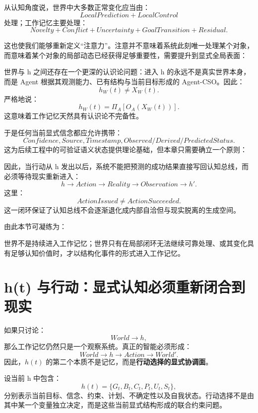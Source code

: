 从认知角度说，世界中大多数正常变化应当由：
\[
LocalPrediction
+
LocalControl
\]
处理；工作记忆主要处理：
\[
Novelty
+
Conflict
+
Uncertainty
+
GoalTransition
+
Residual.
\]

这也使我们能够重新定义“注意力”。注意并不意味着系统此刻唯一处理某个对象，而意味着某个对象的局部动态已经获得足够重要性，需要提升到显式全局表面：
\begin{statementbox}
\centering
{}
\end{statementbox}

世界与 h 之间还存在一个更深的认识论问题：进入 h 的永远不是真实世界本身，而是 Agent 根据其观测能力、已有结构与当前目标形成的 Agent-CSO。因此：
\[
h_W(t)
\neq
X_W(t).
\]
严格地说：
\[
h_W(t)
=
\Pi_A
\left[
O_A(X_W(t))
\right].
\]
这意味着工作记忆天然具有认识论不完备性。

于是任何当前显式信念都应允许携带：
\[
Confidence,
Source,
Timestamp,
Observed/Derived/PredictedStatus.
\]
这为后续工程中的可验证语义状态提供理论基础，但本章只需要确立一个原则：
\begin{statementbox}
\centering
{}
\end{statementbox}

因此，当行动从 h 发出以后，系统不能把预测的成功结果直接写回认知总线，而必须等待现实重新进入：
\[
h
\rightarrow
Action
\rightarrow
Reality
\rightarrow
Observation
\rightarrow
h'.
\]
这里：
\[
ActionIssued
\neq
ActionSucceeded.
\]
这一闭环保证了认知总线不会逐渐退化成内部自洽但与现实脱离的生成空间。

由此本节可凝练为：
\begin{statementbox}
世界不是持续进入工作记忆；世界只有在局部闭环无法继续可靠处理、或其变化具有足够认知价值时，才以结构化事件的形式进入工作记忆。
\end{statementbox}

\section{h(t) 与行动：显式认知必须重新闭合到现实}

如果只讨论：
\[
World\rightarrow h,
\]
那么工作记忆仍然只是一个观察系统。真正的智能必须形成：
\[
World
\rightarrow
h
\rightarrow
Action
\rightarrow
World'.
\]
因此，$h(t)$ 的第二个本质不是记忆，而是\textbf{行动选择的显式协调面}。

设当前 h 中包含：
\[
h(t)=
\{
G_t,
B_t,
C_t,
P_t,
U_t,
S_t
\},
\]
分别表示当前目标、信念、约束、计划、不确定性以及自我状态。行动选择不是由其中某一个变量独立决定，而是这些当前显式结构形成的联合约束问题。

